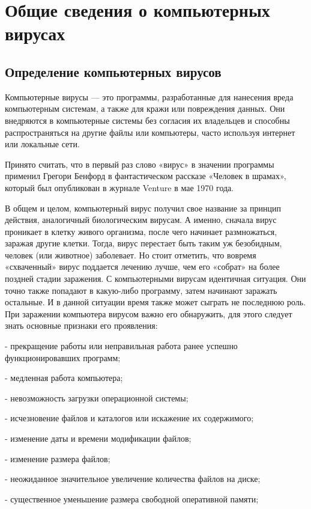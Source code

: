 \section{Общие сведения о компьютерных вирусах}

\subsection{Определение компьютерных вирусов}

Компьютерные вирусы — это программы, разработанные для нанесения вреда компьютерным системам, а также для кражи или повреждения данных. Они внедряются в компьютерные системы без согласия их владельцев и способны распространяться на другие файлы или компьютеры, часто используя интернет или локальные сети.

Принято считать, что в первый раз слово «вирус» в значении программы применил Грегори Бенфорд в фантастическом рассказе «Человек в шрамах», который был опубликован в журнале Venture в мае 1970 года.

В общем и целом, компьютерный вирус получил свое название за принцип действия, аналогичный биологическим вирусам. А именно, сначала вирус проникает в клетку живого организма, после чего начинает размножаться, заражая другие клетки. Тогда, вирус перестает быть таким уж безобидным, человек (или животное) заболевает. Но стоит отметить, что вовремя «схваченный» вирус поддается лечению лучше, чем его «собрат» на более поздней стадии заражения. С компьютерными вирусам идентичная ситуация. Они точно также попадают в какую-либо программу, затем начинают заражать остальные. И в данной ситуации время также может сыграть не последнюю роль. 
При заражении компьютера вирусом важно его обнаружить, для этого следует знать основные признаки его проявления: 

- прекращение работы или неправильная работа ранее успешно функционировавших программ; 

- медленная работа компьютера; 

- невозможность загрузки операционной системы; 

- исчезновение файлов и каталогов или искажение их содержимого;
 
- изменение даты и времени модификации файлов; 

- изменение размера файлов;
 
- неожиданное значительное увеличение количества файлов на диске;
 
- существенное уменьшение размера свободной оперативной памяти;
 
